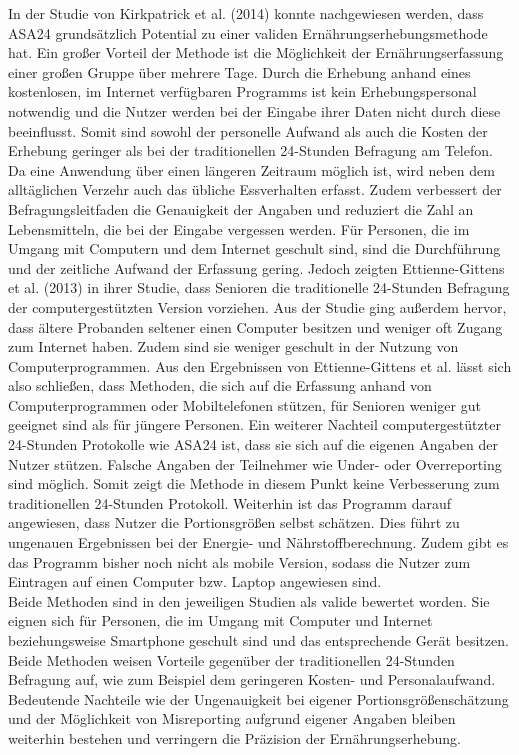In der Studie von Kirkpatrick et al. (2014) konnte nachgewiesen werden, dass ASA24 grundsätzlich Potential zu einer validen Ernährungserhebungsmethode hat. Ein großer Vorteil der Methode ist die Möglichkeit der  Ernährungserfassung einer großen Gruppe über mehrere Tage. Durch die Erhebung anhand eines kostenlosen, im Internet verfügbaren Programms ist kein Erhebungspersonal notwendig und die Nutzer werden bei der Eingabe ihrer Daten nicht durch diese beeinflusst. Somit sind sowohl der personelle Aufwand als auch die Kosten der Erhebung geringer als bei der traditionellen 24-Stunden Befragung am Telefon. Da eine Anwendung über einen längeren Zeitraum möglich ist, wird neben dem alltäglichen Verzehr auch das übliche Essverhalten erfasst. Zudem verbessert der Befragungsleitfaden die Genauigkeit der Angaben und reduziert die Zahl an Lebensmitteln, die bei der Eingabe vergessen werden. Für Personen, die im Umgang mit Computern und dem Internet geschult sind, sind die Durchführung und der zeitliche Aufwand der Erfassung gering. Jedoch zeigten Ettienne-Gittens et al. (2013) in ihrer Studie, dass Senioren die traditionelle 24-Stunden Befragung der computergestützten Version vorziehen. Aus der Studie ging außerdem hervor, dass ältere Probanden seltener einen Computer besitzen und weniger oft Zugang zum Internet haben. Zudem sind sie weniger geschult in der Nutzung von Computerprogrammen. Aus den Ergebnissen von Ettienne-Gittens et al. lässt sich also schließen, dass Methoden, die sich auf die Erfassung anhand von Computerprogrammen oder Mobiltelefonen stützen, für Senioren weniger gut geeignet sind als für jüngere Personen. Ein weiterer Nachteil computergestützter 24-Stunden Protokolle wie ASA24 ist, dass sie sich auf die eigenen Angaben der Nutzer stützen. Falsche Angaben der Teilnehmer wie Under- oder Overreporting sind möglich. Somit zeigt die Methode in diesem Punkt keine Verbesserung zum traditionellen 24-Stunden Protokoll. Weiterhin ist das Programm darauf angewiesen, dass Nutzer die Portionsgrößen selbst schätzen. Dies führt zu ungenauen Ergebnissen bei der Energie- und Nährstoffberechnung. Zudem gibt es das Programm bisher noch nicht als mobile Version, sodass die Nutzer zum Eintragen auf einen Computer bzw. Laptop angewiesen sind. \\
Beide Methoden sind in den jeweiligen Studien als valide bewertet worden. Sie eignen sich für Personen, die im Umgang mit Computer und Internet beziehungsweise Smartphone geschult sind und das entsprechende Gerät besitzen. Beide Methoden weisen Vorteile gegenüber der traditionellen 24-Stunden Befragung auf, wie zum Beispiel dem geringeren Kosten- und Personalaufwand. Bedeutende Nachteile wie der Ungenauigkeit bei eigener Portionsgrößenschätzung und der Möglichkeit von Misreporting aufgrund eigener Angaben bleiben weiterhin bestehen und verringern die Präzision der Ernährungserhebung. 

